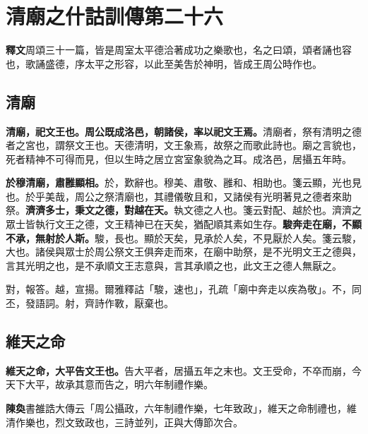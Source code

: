 \chapter{清廟之什詁訓傳第二十六}

\begin{quoting}\textbf{釋文}周頌三十一篇，皆是周室太平德洽著成功之樂歌也，名之曰頌，頌者誦也容也，歌誦盛德，序太平之形容，以此至美吿於神明，皆成王周公時作也。\end{quoting}

\section{清廟}


\textbf{清廟，祀文王也。周公既成洛邑，朝諸侯，率以祀文王焉。}{\footnotesize 清廟者，祭有清明之德者之宮也，謂祭文王也。天德清明，文王象焉，故祭之而歌此詩也。廟之言貌也，死者精神不可得而見，但以生時之居立宮室象貌為之耳。成洛邑，居攝五年時。}

\textbf{於穆清廟，肅雝顯相。}{\footnotesize 於，歎辭也。穆美、肅敬、雝和、相助也。箋云顯，光也見也。於乎美哉，周公之祭清廟也，其禮儀敬且和，又諸侯有光明著見之德者來助祭。}\textbf{濟濟多士，秉文之德，對越在天。}{\footnotesize 執文德之人也。箋云對配、越於也。濟濟之眾士皆執行文王之德，文王精神已在天矣，猶配順其素如生存。}\textbf{駿奔走在廟，不顯不承，無射於人斯。}{\footnotesize 駿，長也。顯於天矣，見承於人矣，不見厭於人矣。箋云駿，大也。諸侯與眾士於周公祭文王俱奔走而來，在廟中助祭，是不光明文王之德與，言其光明之也，是不承順文王志意與，言其承順之也，此文王之德人無厭之。}

\begin{quoting}對，報答。越，宣揚。爾雅釋詁「駿，速也」，孔疏「廟中奔走以疾為敬」。不，同丕，發語詞。射，齊詩作斁，厭棄也。\end{quoting}

\section{維天之命}


\textbf{維天之命，大平告文王也。}{\footnotesize 告大平者，居攝五年之末也。文王受命，不卒而崩，今天下大平，故承其意而告之，明六年制禮作樂。}

\begin{quoting}\textbf{陳奐}書雒誥大傳云「周公攝政，六年制禮作樂，七年致政」，維天之命制禮也，維清作樂也，烈文致政也，三詩並列，正與大傳節次合。\end{quoting}


